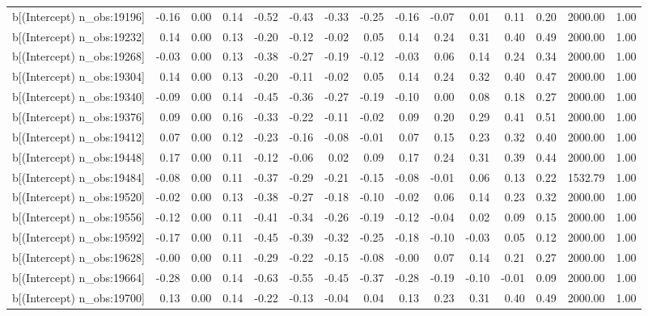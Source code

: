 \begin{table}[ht]
\begin{tabular}{rrrrrrrrrrrrrrr}
  b[(Intercept) n\_obs:19196] & -0.16 & 0.00 & 0.14 & -0.52 & -0.43 & -0.33 & -0.25 & -0.16 & -0.07 & 0.01 & 0.11 & 0.20 & 2000.00 & 1.00 \\ 
  b[(Intercept) n\_obs:19232] & 0.14 & 0.00 & 0.13 & -0.20 & -0.12 & -0.02 & 0.05 & 0.14 & 0.24 & 0.31 & 0.40 & 0.49 & 2000.00 & 1.00 \\ 
  b[(Intercept) n\_obs:19268] & -0.03 & 0.00 & 0.13 & -0.38 & -0.27 & -0.19 & -0.12 & -0.03 & 0.06 & 0.14 & 0.24 & 0.34 & 2000.00 & 1.00 \\ 
  b[(Intercept) n\_obs:19304] & 0.14 & 0.00 & 0.13 & -0.20 & -0.11 & -0.02 & 0.05 & 0.14 & 0.24 & 0.32 & 0.40 & 0.47 & 2000.00 & 1.00 \\ 
  b[(Intercept) n\_obs:19340] & -0.09 & 0.00 & 0.14 & -0.45 & -0.36 & -0.27 & -0.19 & -0.10 & 0.00 & 0.08 & 0.18 & 0.27 & 2000.00 & 1.00 \\ 
  b[(Intercept) n\_obs:19376] & 0.09 & 0.00 & 0.16 & -0.33 & -0.22 & -0.11 & -0.02 & 0.09 & 0.20 & 0.29 & 0.41 & 0.51 & 2000.00 & 1.00 \\ 
  b[(Intercept) n\_obs:19412] & 0.07 & 0.00 & 0.12 & -0.23 & -0.16 & -0.08 & -0.01 & 0.07 & 0.15 & 0.23 & 0.32 & 0.40 & 2000.00 & 1.00 \\ 
  b[(Intercept) n\_obs:19448] & 0.17 & 0.00 & 0.11 & -0.12 & -0.06 & 0.02 & 0.09 & 0.17 & 0.24 & 0.31 & 0.39 & 0.44 & 2000.00 & 1.00 \\ 
  b[(Intercept) n\_obs:19484] & -0.08 & 0.00 & 0.11 & -0.37 & -0.29 & -0.21 & -0.15 & -0.08 & -0.01 & 0.06 & 0.13 & 0.22 & 1532.79 & 1.00 \\ 
  b[(Intercept) n\_obs:19520] & -0.02 & 0.00 & 0.13 & -0.38 & -0.27 & -0.18 & -0.10 & -0.02 & 0.06 & 0.14 & 0.23 & 0.32 & 2000.00 & 1.00 \\ 
  b[(Intercept) n\_obs:19556] & -0.12 & 0.00 & 0.11 & -0.41 & -0.34 & -0.26 & -0.19 & -0.12 & -0.04 & 0.02 & 0.09 & 0.15 & 2000.00 & 1.00 \\ 
  b[(Intercept) n\_obs:19592] & -0.17 & 0.00 & 0.11 & -0.45 & -0.39 & -0.32 & -0.25 & -0.18 & -0.10 & -0.03 & 0.05 & 0.12 & 2000.00 & 1.00 \\ 
  b[(Intercept) n\_obs:19628] & -0.00 & 0.00 & 0.11 & -0.29 & -0.22 & -0.15 & -0.08 & -0.00 & 0.07 & 0.14 & 0.21 & 0.27 & 2000.00 & 1.00 \\ 
  b[(Intercept) n\_obs:19664] & -0.28 & 0.00 & 0.14 & -0.63 & -0.55 & -0.45 & -0.37 & -0.28 & -0.19 & -0.10 & -0.01 & 0.09 & 2000.00 & 1.00 \\ 
  b[(Intercept) n\_obs:19700] & 0.13 & 0.00 & 0.14 & -0.22 & -0.13 & -0.04 & 0.04 & 0.13 & 0.23 & 0.31 & 0.40 & 0.49 & 2000.00 & 1.00 \\ 

\end{tabular}
\end{table}
